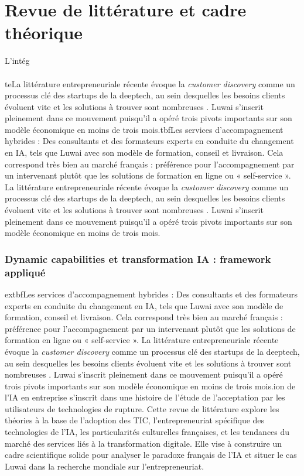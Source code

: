\chapter{Revue de littérature et cadre théorique}
\label{chap:literature_review}

L'intég\\\\teLa littérature entrepreneuriale récente évoque la \textit{customer discovery} comme un processus clé des startups de la deeptech, au sein desquelles les besoins clients évoluent vite et les solutions à trouver sont nombreuses \cite{blank2013startup, osterwalder2014value}. Luwai s'inscrit pleinement dans ce mouvement puisqu'il a opéré trois pivots importants sur son modèle économique en moins de trois mois.tbf{Les services d'accompagnement hybrides} : Des consultants et des formateurs experts en conduite du changement en IA, tels que Luwai avec son modèle de formation, conseil et livraison. Cela correspond très bien au marché français : préférence pour l'accompagnement par un intervenant plutôt que les solutions de formation en ligne ou « self-service ».
La littérature entrepreneuriale récente évoque la \textit{customer discovery} comme un processus clé des startups de la deeptech, au sein desquelles les besoins clients évoluent vite et les solutions à trouver sont nombreuses \cite{blank2013startup, osterwalder2014value}. Luwai s'inscrit pleinement dans ce mouvement puisqu'il a opéré trois pivots importants sur son modèle économique en moins de trois mois.

\subsection{Dynamic capabilities et transformation IA : framework appliqué}extbf{Les services d'accompagnement hybrides} : Des consultants et des formateurs experts en conduite du changement en IA, tels que Luwai avec son modèle de formation, conseil et livraison. Cela correspond très bien au marché français : préférence pour l'accompagnement par un intervenant plutôt que les solutions de formation en ligne ou « self-service ».
La littérature entrepreneuriale récente évoque la \textit{customer discovery} comme un processus clé des startups de la deeptech, au sein desquelles les besoins clients évoluent vite et les solutions à trouver sont nombreuses \cite{blank2013startup, osterwalder2014value}. Luwai s'inscrit pleinement dans ce mouvement puisqu'il a opéré trois pivots importants sur son modèle économique en moins de trois mois.ion de l'IA en entreprise s'inscrit dans une histoire de l'étude de l'acceptation par les utilisateurs de technologies de rupture. Cette revue de littérature explore les théories à la base de l'adoption des TIC, l'entrepreneuriat spécifique des technologies de l'IA, les particularités culturelles françaises, et les tendances du marché des services liés à la transformation digitale. Elle vise à construire un cadre scientifique solide pour analyser le paradoxe français de l'IA et situer le cas Luwai dans la recherche mondiale sur l'entrepreneuriat.

